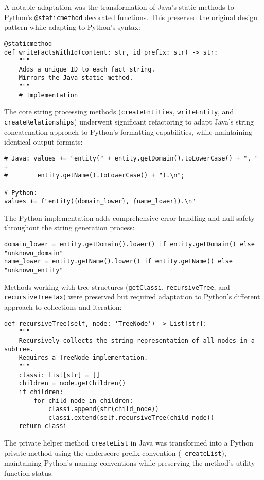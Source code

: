 \documentclass[12pt,a4paper]{article}
\begin{document}
A notable adaptation was the transformation of Java's static methods to Python's \texttt{@staticmethod} decorated functions. This preserved the original design pattern while adapting to Python's syntax:

\begin{verbatim}
@staticmethod
def writeFactsWithId(content: str, id_prefix: str) -> str:
    """
    Adds a unique ID to each fact string.
    Mirrors the Java static method.
    """
    # Implementation
\end{verbatim}

The core string processing methods (\texttt{createEntities}, \texttt{writeEntity}, and \texttt{createRelationships}) underwent significant refactoring to adapt Java's string concatenation approach to Python's formatting capabilities, while maintaining identical output formats:

\begin{verbatim}
# Java: values += "entity(" + entity.getDomain().toLowerCase() + ", " + 
#        entity.getName().toLowerCase() + ").\n";

# Python:
values += f"entity({domain_lower}, {name_lower}).\n"
\end{verbatim}

The Python implementation adds comprehensive error handling and null-safety throughout the string generation process:

\begin{verbatim}
domain_lower = entity.getDomain().lower() if entity.getDomain() else "unknown_domain"
name_lower = entity.getName().lower() if entity.getName() else "unknown_entity"
\end{verbatim}

Methods working with tree structures (\texttt{getClassi}, \texttt{recursiveTree}, and \texttt{recursiveTreeTax}) were preserved but required adaptation to Python's different approach to collections and iteration:

\begin{verbatim}
def recursiveTree(self, node: 'TreeNode') -> List[str]:
    """
    Recursively collects the string representation of all nodes in a subtree.
    Requires a TreeNode implementation.
    """
    classi: List[str] = []
    children = node.getChildren()
    if children:
        for child_node in children:
            classi.append(str(child_node))
            classi.extend(self.recursiveTree(child_node))
    return classi
\end{verbatim}

The private helper method \texttt{createList} in Java was transformed into a Python private method using the underscore prefix convention (\texttt{\_createList}), maintaining Python's naming conventions while preserving the method's utility function status.
\end{document}
